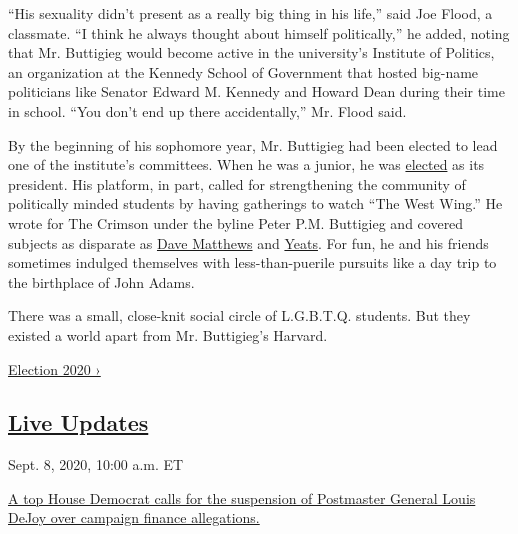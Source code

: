 ``His sexuality didn't present as a really big thing in his life,'' said
Joe Flood, a classmate. ``I think he always thought about himself
politically,'' he added, noting that Mr. Buttigieg would become active
in the university's Institute of Politics, an organization at the
Kennedy School of Government that hosted big-name politicians like
Senator Edward M. Kennedy and Howard Dean during their time in school.
``You don't end up there accidentally,'' Mr. Flood said.

By the beginning of his sophomore year, Mr. Buttigieg had been elected
to lead one of the institute's committees. When he was a junior, he was
\href{https://www.thecrimson.com/article/2002/12/6/iop-members-elect-new-board-the/}{elected}
as its president. His platform, in part, called for strengthening the
community of politically minded students by having gatherings to watch
``The West Wing.'' He wrote for The Crimson under the byline Peter P.M.
Buttigieg and covered subjects as disparate as
\href{https://www.thecrimson.com/article/2003/11/10/rock-the-vote-this-week-i/}{Dave
Matthews} and
\href{https://www.thecrimson.com/article/2003/9/29/frightenedand-fighting-fear-if-you-feel/}{Yeats}.
For fun, he and his friends sometimes indulged themselves with
less-than-puerile pursuits like a day trip to the birthplace of John
Adams.

There was a small, close-knit social circle of L.G.B.T.Q. students. But
they existed a world apart from Mr. Buttigieg's Harvard.

\href{https://www.nytimes3xbfgragh.onion/news-event/2020-election}{Election
2020 ›}

\hypertarget{live-updates}{%
\subsection{\texorpdfstring{\href{https://www.nytimes3xbfgragh.onion/live/2020/09/08/us/trump-vs-biden}{Live
Updates}}{Live Updates}}\label{live-updates}}

\href{https://www.nytimes3xbfgragh.onion/live/2020/09/08/us/trump-vs-biden\#a-top-house-democrat-calls-for-the-suspension-of-postmaster-general-louis-dejoy-over-campaign-finance-allegations}{}

Sept. 8, 2020, 10:00 a.m. ET

\href{https://www.nytimes3xbfgragh.onion/live/2020/09/08/us/trump-vs-biden\#a-top-house-democrat-calls-for-the-suspension-of-postmaster-general-louis-dejoy-over-campaign-finance-allegations}{A
top House Democrat calls for the suspension of Postmaster General Louis
DeJoy over campaign finance
allegations.}\href{https://www.nytimes3xbfgragh.onion/live/2020/09/08/us/trump-vs-biden\#in-a-closely-watched-new-hampshire-primary-democrats-will-pick-a-challenger-to-governor-sununu}{}

